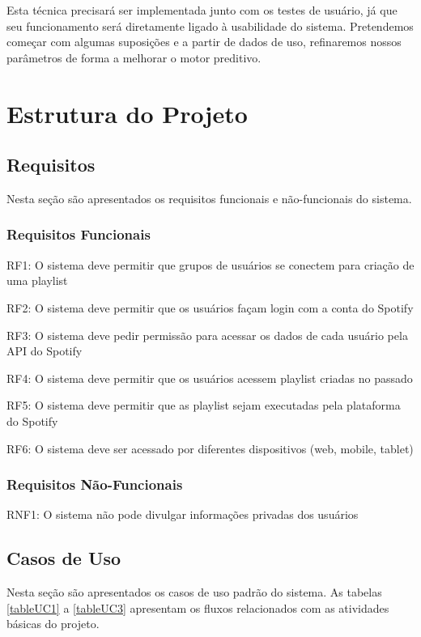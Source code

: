 \documentclass[
	12pt,				%
    oneside,			%
	a4paper,			%
	english,			%
	french,				%
	spanish,			%
	brazil,				%
	]{abntex2}
\begin{document}
Esta técnica precisará ser implementada junto com os testes de usuário, já que seu funcionamento será diretamente ligado à usabilidade do sistema. Pretendemos começar com algumas suposições e a partir de dados de uso, refinaremos nossos parâmetros de forma a melhorar o motor preditivo.

\chapter{Estrutura do Projeto}

\section{Requisitos}

Nesta seção são apresentados os requisitos funcionais e não-funcionais do sistema.

\subsection{Requisitos Funcionais}
RF1: O sistema deve permitir que grupos de usuários se conectem para criação de uma playlist

RF2: O sistema deve permitir que os usuários façam login com a conta do Spotify

RF3: O sistema deve pedir permissão para acessar os dados de cada usuário pela API do Spotify

RF4: O sistema deve permitir que os usuários acessem playlist criadas no passado

RF5: O sistema deve permitir que as playlist sejam executadas pela plataforma do Spotify

RF6: O sistema deve ser acessado por diferentes dispositivos (web, mobile, tablet)


\subsection{Requisitos Não-Funcionais}
RNF1: O sistema não pode divulgar informações privadas dos usuários

\section{Casos de Uso}

Nesta seção são apresentados os casos de uso padrão do sistema. As tabelas \ref{tableUC1} a \ref{tableUC3} apresentam os fluxos relacionados com as atividades básicas do projeto.
\end{document}
